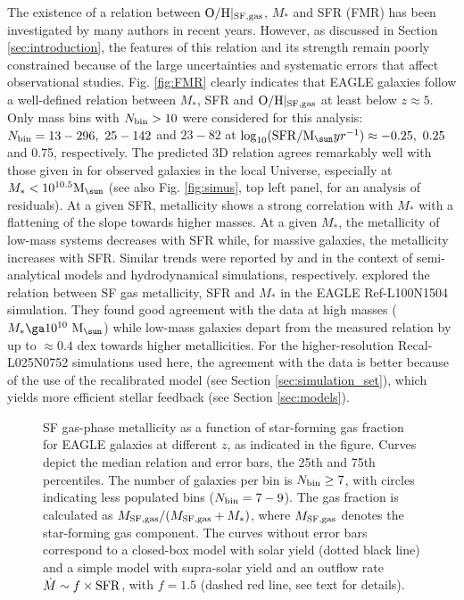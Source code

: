\documentclass[useAMS,usenatbib]{mn2e}
\begin{document}
The existence of a relation between ${\rm O/H}|_{\rm SF,gas}$, $M_*$ and SFR (FMR) 
has been investigated by many authors in recent years.
However, as discussed in Section \ref{sec:introduction},
the features of this relation and its strength remain poorly constrained because of the large
uncertainties and systematic errors that affect observational studies.
Fig. \ref{fig:FMR} clearly indicates that {\sc EAGLE} galaxies follow a well-defined relation
between $M_*$, SFR and ${\rm O/H}|_{\rm SF,gas}$ at least below $z \approx 5$.  
Only mass bins with $N_{\rm bin} > 10$ were considered for this analysis: 
$N_{\rm bin} = 13-296, \ 25-142$ and $23-82$ at 
$\log_{10} ({\rm SFR} / {\rm M}_{\sun}yr^{-1}) \approx -0.25, \ 0.25$ and 0.75, respectively. 
The predicted 3D relation agrees remarkably well
with those given in \citet{mannucci2010} for observed galaxies in the local Universe, especially at $M_* < 10^{10.5} {\rm M}_{\sun}$
(see also Fig. \ref{fig:simus}, top left panel, for an analysis of residuals).
At a given SFR, metallicity shows a strong correlation with $M_*$
with a flattening of the slope towards higher masses.  At a given $M_*$, the metallicity of
low-mass systems decreases with SFR while, for massive galaxies, the metallicity 
increases with SFR. Similar trends were reported by \citet{yates2011} and \citet{derossi2015} in the context of
semi-analytical models and hydrodynamical simulations, respectively. 
\citet{lagos2015} explored the relation between SF gas metallicity, SFR and $M_*$ 
in the {\sc EAGLE} Ref-L100N1504 simulation. 
They found good agreement with the data at high masses ($M_* \ga 10^{10} \ {\rm M}_{\sun}$) while
low-mass galaxies depart from the measured relation by up to $\approx 0.4$ dex towards higher metallicities.
For the higher-resolution Recal-L025N0752 simulations used here, the agreement with the data is better because
of the use of the recalibrated model (see Section \ref{sec:simulation_set}), which yields
more efficient stellar feedback (see Section \ref{sec:models}).


\begin{figure}
\begin{center}
\end{center}
\vspace{-0.5cm}
\caption[]
{
SF gas-phase metallicity as a function of star-forming gas fraction 
for {\sc EAGLE} galaxies at different $z$, as indicated in the figure. 
Curves depict the median relation and error bars, the 25th and 75th percentiles.
The number of galaxies per bin is $N_{\rm bin} \ge 7$, with circles indicating less populated
bins ($N_{\rm bin} = 7-9$).
The gas fraction is calculated as $M_{\rm SF,gas} / (M_{\rm SF,gas} + M_{*})$, where
$M_{\rm SF,gas}$ denotes the star-forming gas component. 
The curves without error bars correspond to a closed-box
model with solar yield (dotted black line) and a simple model with
supra-solar yield and an outflow rate $\dot{M} \sim f \times {\rm SFR}$,
with $f=1.5$
(dashed red line, see text for details).
}
\label{fig:OH_vs_fg}
\end{figure}
\end{document}
